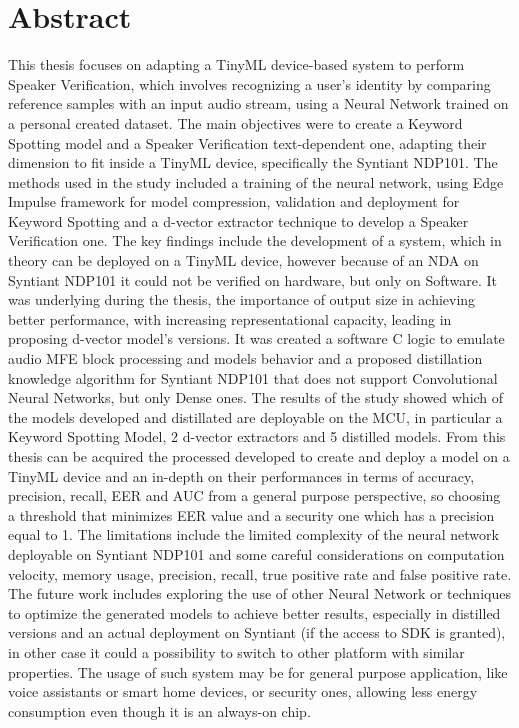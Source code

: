 \chapter*{Abstract} %
\label{abtract}
This thesis focuses on adapting a TinyML device-based system to perform Speaker Verification, which involves recognizing a user's identity by comparing reference samples with an input audio stream, using a Neural Network trained on a personal created dataset. The main objectives were to create a Keyword Spotting model and a Speaker Verification text-dependent one, adapting their dimension to fit inside a TinyML device, specifically the Syntiant NDP101. The methods used in the study included a training of the neural network, using Edge Impulse framework for model compression, validation and deployment for Keyword Spotting and a d-vector extractor technique to develop a Speaker Verification one. The key findings include the development of a system, which in theory can be deployed on a TinyML device, however because of an NDA on Syntiant NDP101 it could not be verified on hardware, but only on Software. It was underlying during the thesis, the importance of output size in achieving better performance, with increasing representational capacity, leading in proposing d-vector model's versions. It was created a software C logic to emulate audio MFE block processing and models behavior and a proposed distillation knowledge algorithm for Syntiant NDP101 that does not support Convolutional Neural Networks, but only Dense ones. The results of the study showed which of the models developed and distillated are deployable on the MCU, in particular a Keyword Spotting Model, 2 d-vector extractors and 5 distilled models. From this thesis can be acquired the processed developed to create and deploy a model on a TinyML device and an in-depth on their performances in terms of accuracy, precision, recall, EER and AUC from a general purpose perspective, so choosing a threshold that minimizes EER value and a security one which has a precision equal to 1. 
The limitations include the limited complexity of the neural network deployable on Syntiant NDP101 and some careful considerations on computation velocity, memory usage, precision, recall, true positive rate and false positive rate. The future work includes exploring the use of other Neural Network or techniques to optimize the generated models to achieve better results, especially in distilled versions and an actual deployment on Syntiant (if the access to SDK is granted), in other case it could a possibility to switch to other platform with similar properties. The usage of such system may be for general purpose application, like voice assistants or smart home devices, or security ones, allowing less energy consumption even though it is an always-on chip.\newline\newline


